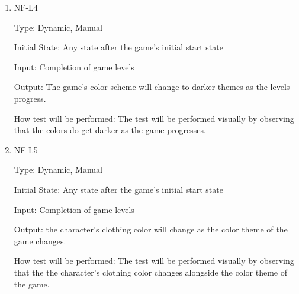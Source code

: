 \documentclass[12pt, titlepage]{article}
\begin{document}
\begin{enumerate}
\item{NF-L4\\}

Type: Dynamic, Manual
					
Initial State: Any state after the game's initial start state
					
Input: Completion of game levels
					
Output: The game's color scheme will change to darker themes as the levels progress.
					
How test will be performed: The test will be performed visually by observing that the colors do get darker as the game progresses. 

\item{NF-L5\\}

Type: Dynamic, Manual
					
Initial State: Any state after the game's initial start state
					
Input: Completion of game levels
					
Output: the character's clothing color will change as the color theme of the game changes. 
					
How test will be performed: The test will be performed visually by observing that the the character's clothing color changes alongside the color theme of the game.





\end{enumerate}
\end{document}
